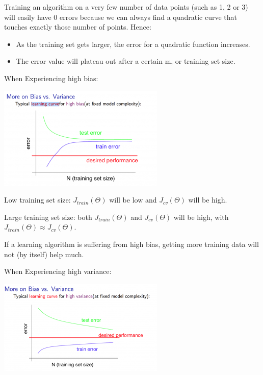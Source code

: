 \documentclass{article}
\begin{document}
\noindent Training an algorithm on a very few number of data points (such as 1, 2 or 3) will easily have 0 errors because we can always find a quadratic curve that touches exactly those number of points. Hence:

\begin{itemize}
\item As the training set gets larger, the error for a quadratic function increases.
\item The error value will plateau out after a certain m, or training set size.
\end{itemize}

\noindent When Experiencing high bias:

\begin{center}
\includegraphics[scale=0.6]{./images/experiencing_high_bias.png}
\end{center}

\noindent Low training set size: \(J_{train}(\Theta)\) will be low and \(J_{cv}(\Theta)\) will be high.

\noindent Large training set size: both \(J_{train}(\Theta)\) and \(J_{cv}(\Theta)\) will be high, with \(J_{train}(\Theta) \approx J_{cv}(\Theta)\).

\noindent If a learning algorithm is suffering from high bias, getting more training data will not (by itself) help much.

\bigskip

\noindent When Experiencing high variance:

\begin{center}
\includegraphics[scale=0.6]{./images/experiencing_high_variance.png}
\end{center}
\end{document}
